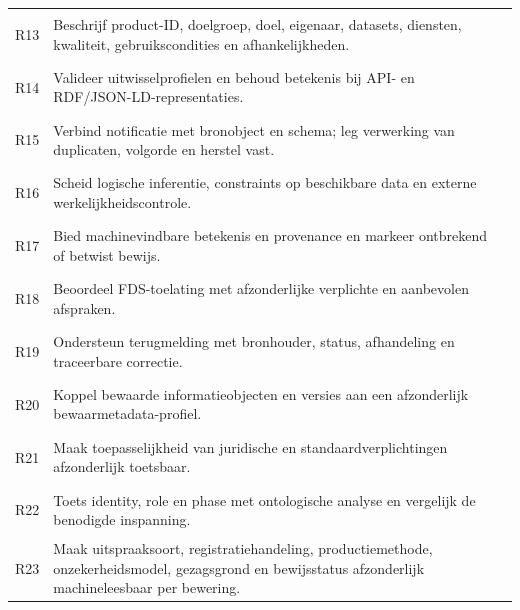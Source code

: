 \begin{longtable}{@{}P{.07\linewidth}P{.64\linewidth}P{.22\linewidth}@{}}
\hypertarget{R13}{}R13 & Beschrijf product-ID, doelgroep, doel, eigenaar, datasets, diensten, kwaliteit, gebruikscondities en afhankelijkheden. & \citep{L12,S16,S47,S27} \\
\hypertarget{R14}{}R14 & Valideer uitwisselprofielen en behoud betekenis bij API- en RDF/JSON-LD-representaties. & \citep{S18,S19,S20,S35} \\
\hypertarget{R15}{}R15 & Verbind notificatie met bronobject en schema; leg verwerking van duplicaten, volgorde en herstel vast. & \citep{S22,L14} \\
\hypertarget{R16}{}R16 & Scheid logische inferentie, constraints op beschikbare data en externe werkelijkheidscontrole. & \citep{S29,S30,S32,S12} \\
\hypertarget{R17}{}R17 & Bied machinevindbare betekenis en provenance en markeer ontbrekend of betwist bewijs. & \citep{L11,S33,L13,L16} \\
\hypertarget{R18}{}R18 & Beoordeel FDS-toelating met afzonderlijke verplichte en aanbevolen afspraken. & \citep{S27} \\
\hypertarget{R19}{}R19 & Ondersteun terugmelding met bronhouder, status, afhandeling en traceerbare correctie. & \citep{S25,S26,S27} \\
\hypertarget{R20}{}R20 & Koppel bewaarde informatieobjecten en versies aan een afzonderlijk bewaarmetadata-profiel. & \citep{S24,S15} \\
\hypertarget{R21}{}R21 & Maak toepasselijkheid van juridische en standaardverplichtingen afzonderlijk toetsbaar. & \citep{S42,S43,S25} \\
\hypertarget{R22}{}R22 & Toets identity, role en phase met ontologische analyse en vergelijk de benodigde inspanning. & \citep{L08,L09,L10,S40,S41} \\
\hypertarget{R23}{}R23 & Maak uitspraaksoort, registratiehandeling, productiemethode, onzekerheidsmodel, gezagsgrond en bewijsstatus afzonderlijk machineleesbaar per bewering. & \citep{S25,S33,S04,L11,L16} \\
\bottomrule\end{longtable}